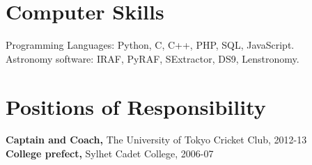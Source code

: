 \documentclass[margin,line]{res}
\newenvironment{list2}{
  \begin{list}{$\bullet$}{%
      \setlength{\itemsep}{0in}
      \setlength{\parsep}{0in} \setlength{\parskip}{0in}
      \setlength{\topsep}{0in} \setlength{\partopsep}{0in} 
      \setlength{\leftmargin}{0.2in}}}{\end{list}}
\begin{document}
\begin{resume}
\section{\sc Computer Skills} 
Programming Languages: Python, C, C++, PHP, SQL, JavaScript.\\
Astronomy software: IRAF, PyRAF, SExtractor, DS9, Lenstronomy.

\section{\sc Positions of Responsibility}
{\bf Captain and Coach,} The University of Tokyo Cricket Club, 2012-13 \\
{\bf College prefect,} Sylhet Cadet College, 2006-07

\end{resume}
\end{document}
